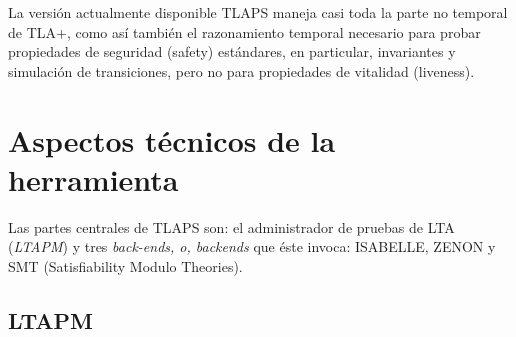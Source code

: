 \documentclass[spanish]{llncs}
\begin{document}
  La versión actualmente disponible TLAPS maneja casi toda la parte no temporal de TLA+, como así también el razonamiento temporal necesario para probar propiedades de 
  seguridad (safety) estándares, en particular, invariantes y simulación de transiciones, pero no para propiedades de vitalidad (liveness).


\section{Aspectos técnicos de la herramienta}

Las partes centrales de TLAPS son: el administrador de pruebas de LTA (\textit{LTAPM}) y tres \textit{back-ends, o, backends} que éste invoca: ISABELLE, ZENON y SMT (Satisfiability Modulo Theories).

  \subsection{LTAPM}
  
\end{document}
